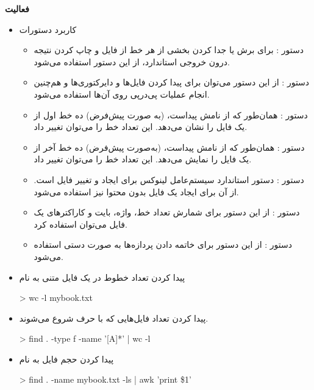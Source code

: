 \textbf{فعالیت}
\begin{itemize}
	\item 
		کاربرد دستورات
		
		\begin{itemize}
			\item دستور : برای برش یا جدا کردن بخشی از هر خط از فایل و چاپ کردن نتیجه درون خروجی استاندارد، از این دستور استفاده می‌شود.
			\item دستور :
			از این دستور می‌توان برای پیدا کردن فایل‌ها و دایرکتوری‌ها و هم‌چنین انجام عملیات پی‌در‌پی روی آن‌ها استفاده می‌شود.
			\item دستور :
			همان‌طور که از نامش پیداست، (به صورت پیش‌فرض) ده خط اول از یک فایل را نشان می‌دهد. این تعداد خط را می‌توان تغییر داد.
			\item دستور :
			همان‌طور که از نامش پیداست، (به‌صورت پیش‌فرض) ده خط آخر از یک فایل را نمایش می‌دهد. این تعداد خط را می‌توان تغییر داد.
			\item دستور :
			دستور استاندارد سیستم‌عامل لینوکس برای ایجاد و تغییر  فایل است. از آن برای ایجاد یک فایل بدون محتوا نیز استفاده می‌شود.
			
			\item دستور :
			از این دستور برای شمارش تعداد خط، واژه، بایت و کاراکترهای یک فایل می‌توان استفاده کرد.
			
			\item دستور :
			از این دستور برای خاتمه دادن پردازه‌ها به صورت دستی استفاده می‌شود.
		\end{itemize}
	\item پیدا کردن تعداد خطوط در یک فایل متنی به نام 
	
	\begin{code}
		> wc -l mybook.txt
	\end{code}

	\item پیدا کردن تعداد فایل‌هایی که با حرف  شروع می‌شوند.
	\begin{code}
		> find . -type f -name '[A]*' | wc -l
	\end{code}
	\item پیدا کردن حجم فایل به نام 
	
	\begin{code}
		> find . -name mybook.txt  -ls | awk '{print \$1}' 
	\end{code}
\end{itemize}